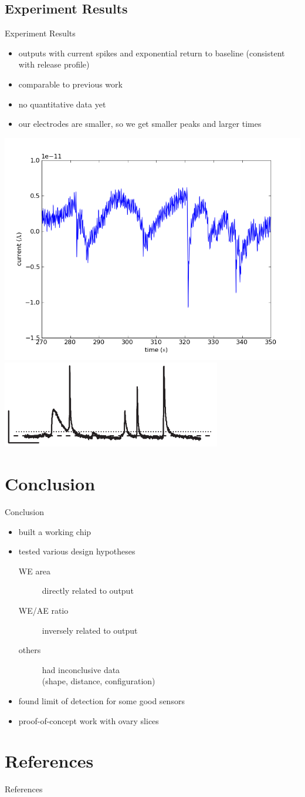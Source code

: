 \documentclass[10pt]{beamer}
\begin{document}
\subsection{Experiment Results}
\begin{frame}{Experiment Results}
	\begin{itemize}
		\item outputs with current spikes and exponential return to baseline (consistent with release profile)
		\item comparable to previous work
		\item no quantitative data yet
		\item our electrodes are smaller, so we get smaller peaks and larger times
	\end{itemize}
	\includegraphics[width=0.5\linewidth]{figures/216.png}
	\includegraphics[width=0.5\linewidth]{figures/mosharok-pulse.png}
\end{frame}

\section{Conclusion}
\begin{frame}{Conclusion}
	\begin{itemize}
		\item built a working chip
		\item tested various design hypotheses
			\begin{description}
				\item[WE area] directly related to output
				\item[WE/AE ratio] inversely related to output
				\item[others] had inconclusive data \\ (shape, distance, configuration)
			\end{description}
		\item found limit of detection for some good sensors
		\item proof-of-concept work with ovary slices
	\end{itemize}
\end{frame}

\section{References}
\begin{frame}[allowframebreaks]{References}
	{}
	
\end{frame}
\end{document}
